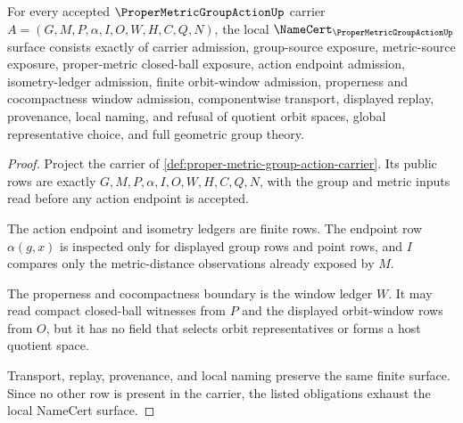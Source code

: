 \begin{theorem}
\label{thm:proper-metric-group-action-namecert-obligations}
For every accepted $\ProperMetricGroupActionUp$ carrier $A=(G,M,P,\alpha,I,O,W,H,C,Q,N)$, the local $\NameCert_{\ProperMetricGroupActionUp}$ surface consists exactly of carrier admission, group-source exposure, metric-source exposure, proper-metric closed-ball exposure, action endpoint admission, isometry-ledger admission, finite orbit-window admission, properness and cocompactness window admission, componentwise transport, displayed replay, provenance, local naming, and refusal of quotient orbit spaces, global representative choice, and full geometric group theory.
\end{theorem}
\begin{proof}
Project the carrier of \autoref{def:proper-metric-group-action-carrier}. Its public rows are exactly $G,M,P,\alpha,I,O,W,H,C,Q,N$, with the group and metric inputs read before any action endpoint is accepted.

The action endpoint and isometry ledgers are finite rows. The endpoint row $\alpha(g,x)$ is inspected only for displayed group rows and point rows, and $I$ compares only the metric-distance observations already exposed by $M$.

The properness and cocompactness boundary is the window ledger $W$. It may read compact closed-ball witnesses from $P$ and the displayed orbit-window rows from $O$, but it has no field that selects orbit representatives or forms a host quotient space.

Transport, replay, provenance, and local naming preserve the same finite surface. Since no other row is present in the carrier, the listed obligations exhaust the local NameCert surface.
\end{proof}

